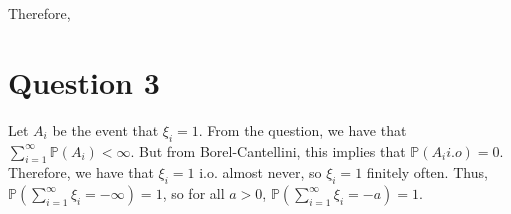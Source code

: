 \documentclass{article}
\theoremstyle{definition}
\numberwithin{theorem}{section}
\numberwithin{equation}{section}
\begin{document}
Therefore, 
\section{Question 3}
Let $A_i$ be the event that $\xi_i= 1$. From the question, we have that $\sum_{i = 1}^{\infty}\mathbb{P}(A_i) < \infty$. But from Borel-Cantellini, this implies that $\mathbb{P}(A_i i.o) = 0$. Therefore, we have that $\xi_i = 1$ i.o. almost never, so $\xi_i = 1$ finitely often. Thus, $\mathbb{P}\left(\sum_{i = 1}^{\infty} \xi_i = - \infty \right) = 1$, so for all $a > 0$, $\mathbb{P}\left(\sum_{i = 1}^{\infty} \xi_i = - a \right) = 1$. 
\end{document}
